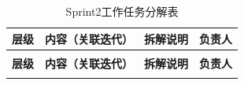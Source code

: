 \begin{enumerate}
\begin{longtable}{>{\centering\arraybackslash}m{2cm} >{\centering\arraybackslash}m{5cm} >{\centering\arraybackslash}m{5cm} >{\centering\arraybackslash}m{1.5cm}}
              \caption{Sprint2工作任务分解表} \label{tab:training}                                                                                              \\

              \toprule
              \textbf{层级}        & \textbf{内容（关联迭代）}                 & \textbf{拆解说明}                                                      & \textbf{负责人} \\
              \midrule
              \endfirsthead

              \multicolumn{4}{c}{{\tablename\ \thetable{} 续表}}                                                                                           \\
              \toprule
              \textbf{层级}        & \textbf{内容（关联迭代）}                 & \textbf{拆解说明}                                                      & \textbf{负责人} \\
              \midrule
              \endhead

              \bottomrule
              \endfoot


\end{longtable}
\end{enumerate}

